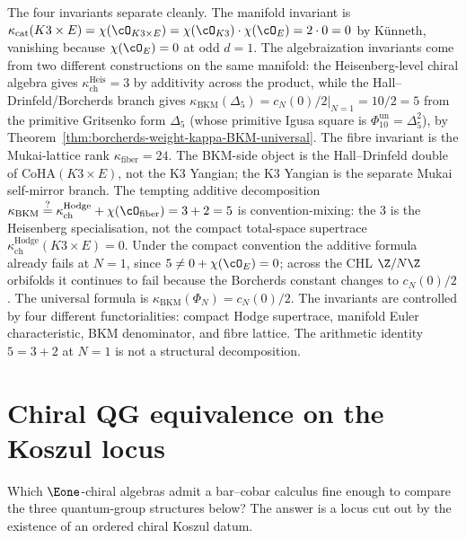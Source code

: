 \begin{remark}
\label{rem:three-kappa-k3xe}
The four invariants separate cleanly. The manifold invariant is
$\kappa_{\mathrm{cat}}(K3 \times E) = \chi(\cO_{K3 \times E})
= \chi(\cO_{K3}) \cdot \chi(\cO_E) = 2 \cdot 0 = 0$ by K\"unneth,
vanishing because $\chi(\cO_E) = 0$ at odd $d = 1$. The
algebraization invariants come from two different constructions on
the same manifold: the Heisenberg-level chiral algebra gives
$\kappa_{\mathrm{ch}}^{\mathrm{Heis}} = 3$ by additivity across the
product, while the Hall--Drinfeld/Borcherds branch gives
$\kappa_{\mathrm{BKM}}(\Delta_5) = \left.c_N(0)/2\right|_{N=1} = 10/2 = 5$ from
the primitive Gritsenko form $\Delta_5$ (whose primitive Igusa square
is $\Phi_{10}^{\mathrm{un}}=\Delta_5^2$), by
Theorem~\ref{thm:borcherds-weight-kappa-BKM-universal}. The fibre invariant is the
Mukai-lattice rank $\kappa_{\mathrm{fiber}}=24$. The BKM-side object is
the Hall--Drinfeld double of $\mathrm{CoHA}(K3\times E)$, not the K3
Yangian; the K3 Yangian is the separate Mukai self-mirror branch. The
tempting additive decomposition
$\kappa_{\mathrm{BKM}} \stackrel{?}{=} \kappa_{\mathrm{ch}}^{\mathrm{Hodge}} + \chi(\cO_{\text{fiber}})
= 3 + 2 = 5$ is convention-mixing: the $3$ is the Heisenberg
specialisation, not the compact total-space supertrace
$\kappa_{\mathrm{ch}}^{\mathrm{Hodge}}(K3 \times E)=0$. Under the compact convention
the additive formula already fails at $N=1$, since
$5 \neq 0 + \chi(\cO_E) = 0$; across the CHL $\Z/N\Z$ orbifolds it
continues to fail because the Borcherds constant changes to
$c_N(0)/2$. The universal formula is
$\kappa_{\mathrm{BKM}}(\Phi_N)=c_N(0)/2$. The invariants are
controlled by four different functorialities: compact Hodge supertrace,
manifold Euler characteristic, BKM denominator, and fibre lattice. The arithmetic
identity $5 = 3 + 2$ at $N = 1$ is not a structural decomposition.
\end{remark}


\section{Chiral QG equivalence on the Koszul locus}
\label{sec:outlook-chiral-qg-koszul}

Which $\Eone$-chiral algebras admit a bar--cobar calculus fine
enough to compare the three quantum-group structures below? The
answer is a locus cut out by the existence of an ordered chiral
Koszul datum.

